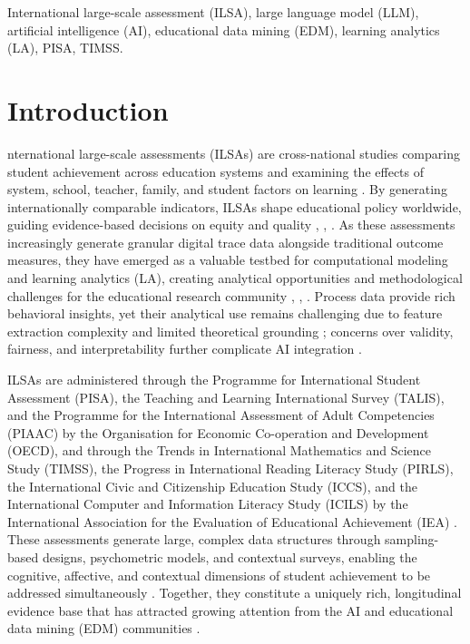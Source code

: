 \documentclass{ieeeaccess}
\begin{document}
\begin{keywords}
International large-scale assessment (ILSA), large language model (LLM), artificial intelligence (AI), educational data mining (EDM), learning analytics (LA), PISA, TIMSS.
\end{keywords}

\titlepgskip=-21pt

\maketitle

\section{Introduction}
\label{sec:introduction}
nternational large-scale assessments (ILSAs) are cross-national studies comparing student achievement across education systems and examining the effects of system, school, teacher, family, and student factors on learning \cite{bezek-gure-etal2020, hernandez-ramos-araya2025}. By generating internationally comparable indicators, ILSAs shape educational policy worldwide, guiding evidence-based decisions on equity and quality \cite{hernandez-torrano-courtney2021}, \cite{robitzsch-ludtke2022}, \cite{scherer-etal2024}. As these assessments increasingly generate granular digital trace data alongside traditional outcome measures, they have emerged as a valuable testbed for computational modeling and learning analytics (LA), creating analytical opportunities and methodological challenges for the educational research community \cite{teig2023}, \cite{murchan-siddiq2021}, \cite{huang-etal2025}. Process data provide rich behavioral insights, yet their analytical use remains challenging due to feature extraction complexity and limited theoretical grounding \cite{huang-etal2025, anghel-etal2024}; concerns over validity, fairness, and interpretability further complicate AI integration \cite{anghel-etal2024}.

ILSAs are administered through the Programme for International Student Assessment (PISA), the Teaching and Learning International Survey (TALIS), and the Programme for the International Assessment of Adult Competencies (PIAAC) by the Organisation for Economic Co-operation and Development (OECD), and through the Trends in International Mathematics and Science Study (TIMSS), the Progress in International Reading Literacy Study (PIRLS), the International Civic and Citizenship Education Study (ICCS), and the International Computer and Information Literacy Study (ICILS) by the International Association for the Evaluation of Educational Achievement (IEA) \cite{nilsen-etal2022}. These assessments generate large, complex data structures through sampling-based designs, psychometric models, and contextual surveys, enabling the cognitive, affective, and contextual dimensions of student achievement to be addressed simultaneously \cite{scherer-etal2024, aydogan-tat2024, shin-etal2025}. Together, they constitute a uniquely rich, longitudinal evidence base that has attracted growing attention from the AI and educational data mining (EDM) communities \cite{alvarez-etal2024, elouafi-etal2025}.
\end{document}
